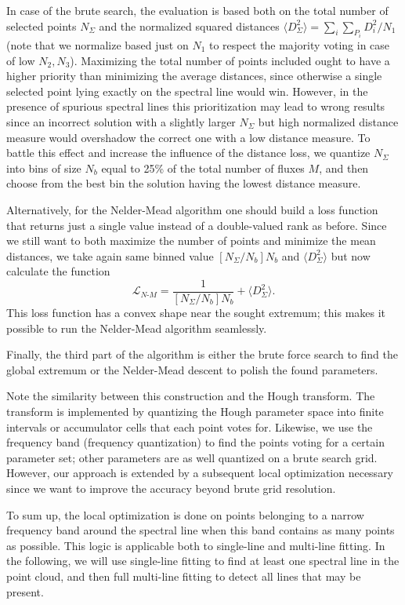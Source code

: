 \documentclass[%
 aip,
 amsmath,amssymb,
 reprint,%
]{revtex4-1}
\begin{document}
In case of the brute search, the evaluation is based both on the total number of selected points $N_\Sigma$ and the normalized squared distances $\langle D_\Sigma^2 \rangle  = {\sum_i \sum_{P_i} D_i^2/N_1}$ (note that we normalize based just on $N_1$ to respect the majority voting in case of low $N_2, N_3$). Maximizing the total number of points included ought to have a higher priority than minimizing the average distances, since otherwise a single selected point lying exactly on the spectral line would win. However, in the presence of spurious spectral lines this prioritization may lead to wrong results since an incorrect solution with a slightly larger $N_\Sigma$ but high normalized distance measure would overshadow the correct one with a low distance measure. To battle this effect and increase the influence of the distance loss, we quantize $N_\Sigma$ into bins of size $N_b$ equal to 25\% of the total number of fluxes $M$, and then choose from the best bin the solution having the lowest distance measure. 

Alternatively, for the Nelder-Mead algorithm one should build a loss function that returns just a single value instead of a double-valued rank as before. Since we still want to both maximize the number of points and minimize the mean distances, we take again same binned value $[N_\Sigma/N_b]N_b$ and $\langle D_\Sigma^2 \rangle$ but now calculate the function
\begin{equation}
\mathcal{L}_{N\text{-}M} = \frac{1}{[N_\Sigma/N_b]N_b} + \langle D_\Sigma^2 \rangle.
\end{equation}
This loss function has a convex shape near the sought extremum; this makes it possible to run the Nelder-Mead algorithm seamlessly.
  
Finally, the third part of the algorithm is either the brute force search to find the global extremum or the Nelder-Mead descent to polish the found parameters.

Note the similarity between this construction and the Hough transform. The transform is implemented by quantizing the Hough parameter space into finite intervals or accumulator cells that each point votes for. Likewise, we use the frequency band (frequency quantization) to find the points voting for a certain parameter set; other parameters are as well quantized on a brute search grid. However, our approach is extended by a subsequent local optimization necessary since we want to improve the accuracy beyond brute grid resolution.

To sum up, the local optimization is done on points belonging to a narrow frequency band around the spectral line when this band contains as many points as possible. This logic is applicable both to single-line and multi-line fitting. In the following, we will use single-line fitting to find at least one spectral line in the point cloud, and then full multi-line fitting to detect all lines that may be present.
\end{document}
